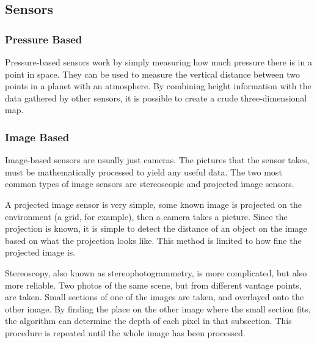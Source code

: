 




\subsection{Sensors}
\subsubsection{Pressure Based}
Pressure-based sensors work by simply measuring how much pressure there is in a point in space. They can be used to measure the vertical distance between two points in a planet with an atmosphere\cite{barometric1}\cite{barometric2}. By combining height information with the data gathered by other sensors, it is possible to create a crude three-dimensional map.

\subsubsection{Image Based}
Image-based sensors are usually just cameras. %
 The pictures that the sensor takes, must be mathematically processed to yield any useful data. The two most common types of image sensors are stereoscopic and projected image sensors.

A projected image sensor is very simple, %
 some known image is projected on the environment (a grid, for example), then a camera takes a picture. Since the projection is known, it is simple to detect the distance of an object on the image based on what the projection looks like. This method is limited to how fine the projected image is. %

Stereoscopy, also known as stereophotogrammetry, is more complicated, but also more reliable. Two photos of the same scene, but from different vantage points, are taken. Small sections of one of the images are taken, and overlayed onto the other image. By finding the place on the other image where the small section fits, the algorithm can determine the depth of each pixel in that subsection. This procedure is repeated until the whole image has been processed.

